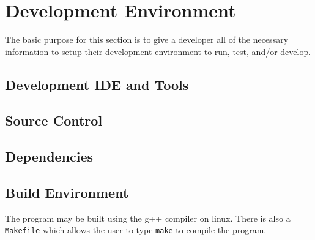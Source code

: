 \chapter{Development Environment}
The basic purpose for this section is to give a developer all of the necessary 
information to setup their development environment to run, test, and/or develop. 


\section{Development IDE and Tools}


\section{Source  Control}


\section{Dependencies}


\section{Build  Environment}
The program may be built using the g++ compiler on linux. There is also a {\tt Makefile} which allows the user to type {\tt make} to compile the program.


